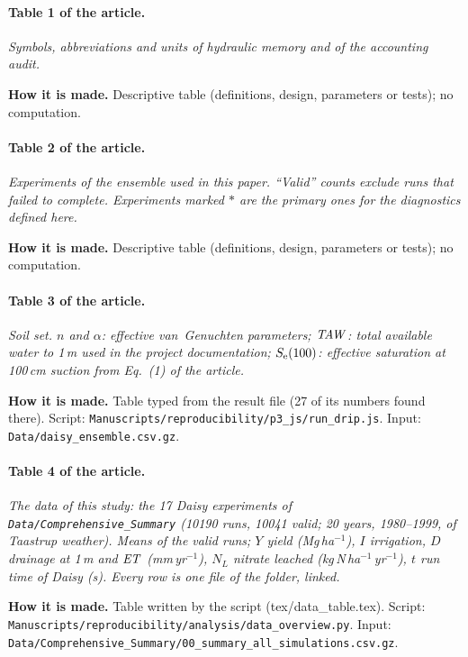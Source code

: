 \paragraph{Table 1 of the article.} \emph{Symbols, abbreviations and units of hydraulic memory and of the accounting audit.}

\textbf{How it is made.} Descriptive table (definitions, design, parameters or tests); no computation.

\paragraph{Table 2 of the article.} \emph{Experiments of the ensemble used in this paper. ``Valid'' counts exclude runs that failed to complete. Experiments marked $\ast$ are the primary ones for the diagnostics defined here.}

\textbf{How it is made.} Descriptive table (definitions, design, parameters or tests); no computation.

\paragraph{Table 3 of the article.} \emph{Soil set. $n$ and $\alpha$: effective van~Genuchten parameters; $\mathit{TAW}$: total available water to 1\,m used in the project documentation; $S_{\mathrm{e}}(100)$: effective saturation at 100\,cm suction from Eq.~(1) of the article.}

\textbf{How it is made.} Table typed from the result file (27 of its numbers found there). Script: \nolinkurl{Manuscripts/reproducibility/p3_js/run_drip.js}. Input: \nolinkurl{Data/daisy_ensemble.csv.gz}.

\paragraph{Table 4 of the article.} \emph{The data of this study: the 17 Daisy experiments of \nolinkurl{Data/Comprehensive_Summary} (10190 runs, 10041 valid; 20 years, 1980--1999, of Taastrup weather). Means of the valid runs; $Y$ yield (Mg\,ha$^{-1}$), $I$ irrigation, $D$ drainage at 1\,m and $\mathit{ET}$ (mm\,yr$^{-1}$), $N_L$ nitrate leached (kg\,N\,ha$^{-1}$\,yr$^{-1}$), $t$ run time of Daisy (s). Every row is one file of the folder, linked.}

\textbf{How it is made.} Table written by the script (tex/data\_table.tex). Script: \nolinkurl{Manuscripts/reproducibility/analysis/data_overview.py}. Input: \nolinkurl{Data/Comprehensive_Summary/00_summary_all_simulations.csv.gz}.

